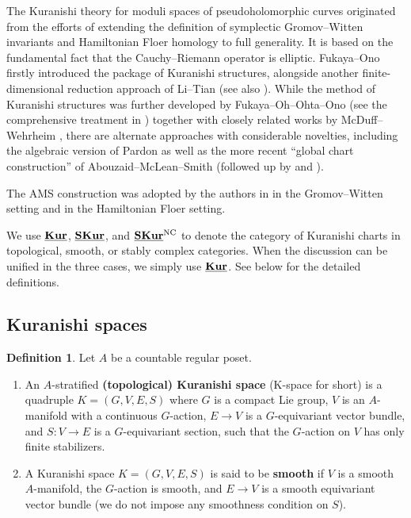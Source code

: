 \documentclass[reqno, 10pt]{amsart}
\numberwithin{equation}{section}
\numberwithin{equation}{section}
\theoremstyle{definition}
\newtheorem{defn}[thm]{Definition}
\theoremstyle{remark}
\newcommand{\uds}[1]{\underline{\smash{#1}}}
\begin{document}
The Kuranishi theory for moduli spaces of pseudoholomorphic curves originated from the efforts of extending the definition of symplectic Gromov--Witten invariants and Hamiltonian Floer homology to full generality. It is based on the fundamental fact that the Cauchy--Riemann operator is elliptic. Fukaya--Ono \cite{Fukaya_Ono} firstly introduced the package of Kuranishi structures, alongside another finite-dimensional reduction approach of Li--Tian \cite{Li_Tian} (see also \cite{Siebert_virtual} \cite{Ruan_virtual}). While the method of Kuranishi structures was further developed by Fukaya--Oh--Ohta--Ono (see the comprehensive treatment in \cite{FOOO_Kuranishi}) together with closely related works by McDuff--Wehrheim \cite{MW_1, MW_2, MW_3}, there are alternate approaches with considerable novelties, including the algebraic version of Pardon \cite{Pardon_virtual} as well as the more recent ``global chart construction'' of Abouzaid--McLean--Smith \cite{AMS} (followed up by \cite{Hirschi_Swaminathan} and \cite{AMS2}). 

The AMS construction was adopted by the authors in \cite{Bai_Xu_2022} in the Gromov--Witten setting and \cite{Bai_Xu_Arnold} in the Hamiltonian Floer setting. 


We use $\uds{\bf Kur}$, $\uds{\bf SKur}$, and $\uds{\bf SKur}^{\rm NC}$ to denote the category of Kuranishi charts in topological, smooth, or stably complex categories. When the discussion can be unified in the three cases, we simply use $\uds{\bf Kur}$. See below for the detailed definitions.


\subsection{Kuranishi spaces}


\begin{defn}\label{defn_K_chart}
Let $A$ be a countable regular poset.

\begin{enumerate}
\item An $A$-stratified {\bf (topological) Kuranishi space} (K-space for short) is a quadruple $K = (G, V, E, S)$ where $G$ is a compact Lie group, $V$ is an  $A$-manifold with a continuous $G$-action, $E \to V$ is a $G$-equivariant vector bundle, and $S: V \to E$ is a $G$-equivariant section, such that the $G$-action on $V$ has only finite stabilizers.%

\item A Kuranishi space $K = (G, V, E, S)$ is said to be {\bf smooth} if $V$ is a smooth  $A$-manifold, the $G$-action is smooth, and $E \to V$ is a smooth equivariant vector bundle (we do not impose any smoothness condition on $S$).

\end{enumerate}
\end{defn}
\end{document}
